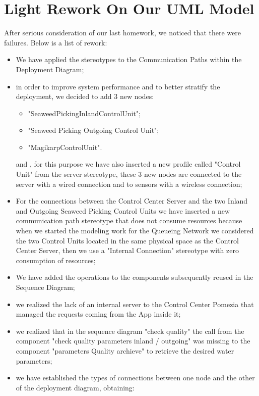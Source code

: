 \chapter{\textbf{Light Rework On Our UML Model}}

After serious consideration of our last homework, we noticed that there were failures. Below is a list of rework:

\begin{itemize}
	\item We have applied the stereotypes to the Communication Paths 		within the Deployment Diagram;
	\item in order to improve system performance and to better 				stratify the deployment, we decided to add 3 new nodes: 
	\begin{itemize}
	\item "SeaweedPickingInlandControlUnit";
	\item "Seaweed Picking Outgoing Control Unit";
	\item "MagikarpControlUnit".
	\end{itemize}					 
	and , for this purpose we have also inserted a new profile called 		"Control Unit" from the	server 	stereotype, these 3 new nodes are 		connected to the server with a wired connection and to sensors 			with a wireless connection;
	\item For the connections between the Control Center Server and 		the	two Inland and Outgoing Seaweed Picking Control Units we 			have inserted a new communication path stereotype that does 			not consume resources because when we started the modeling 				work for the Queueing Network we considered the two Control 			Units located in the same physical space as the Control 				Center Server, then we use a "Internal Connection" stereotype with 	zero consumption of resources;
	\item We have added the operations to the components subsequently 		reused in the Sequence Diagram;
	\item we realized the lack of an internal server to the Control 		Center 	Pomezia that managed the requests coming from the App 			inside it;
	\item we realized that in the sequence diagram "check quality" the 	call from the component "check quality parameters inland /				outgoing" was missing to the component "parameters Quality 				archieve" to retrieve the desired water parameters;
	\item we have established the types of connections between one 			node and the other of the deployment diagram, obtaining:
	

\end{itemize}
